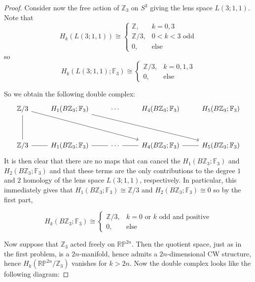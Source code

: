 \documentclass[reqno]{amsart}
\theoremstyle{definition}
\theoremstyle{remark}
\begin{document}
\begin{proof}
Consider now the free action of
$\mathbb{Z}_3$ on $S^3$ giving
 the lens space $L(3;1,1)$.
 Note that
  \[
  H_k(L(3;1,1)) \cong
  \begin{cases}
      \mathbb{Z},& k=0,3\\
      \mathbb{Z} / 3,& 0<k<3 \text{ odd}\\
     0,& \text{else}
  \end{cases}
  \] 
  so
  \[
  H_k\left( L(3;1,1); \mathbb{F}_3 \right) 
  \cong
  \begin{cases}
      \mathbb{Z} /3,& k=0,1,3\\
      0,& \text{else}
  \end{cases}
  \] 

So we obtain the following double complex:
\[
    \begin{tikzcd}
	{\mathbb{Z}/3} & {H_1(B\mathbb{Z}_3;\mathbb{F}_3)}
                   & \cdots & {H_4(B\mathbb{Z}_3;\mathbb{F}_3)}
                   & {H_5(B\mathbb{Z}_3;\mathbb{F}_3)} \\
	\\
	{\mathbb{Z}/3} & {H_1(B\mathbb{Z}_3;\mathbb{F}_3)}
                   & \cdots & {H_4(B\mathbb{Z}_3;\mathbb{F}_3)}
                   & {H_5(B\mathbb{Z}_3;\mathbb{F}_3)}
	\arrow[from=1-1, to=3-4]
	\arrow[from=1-2, to=3-5]
	\arrow[no head, from=3-1, to=1-1]
	\arrow[no head, from=3-1, to=3-2]
	\arrow[no head, from=3-2, to=3-3]
	\arrow[no head, from=3-3, to=3-4]
	\arrow[no head, from=3-4, to=3-5]
\end{tikzcd}
\]
It is then clear that there are no maps that can
cancel the $H_1\left( B\mathbb{Z}_3 ;\mathbb{F}_3\right) $ and
$H_2\left( B\mathbb{Z}_3; \mathbb{F}_3 \right) $ and
that these terms are the only contributions to the
degree $1$ and $2$ homology of the
lens space $L(3;1,1)$, respectively.
In particular, this immediately gives that
$H_1\left( B\mathbb{Z}_3; \mathbb{F}_3 \right)
\cong \mathbb{Z} /3$ and
$H_2 \left( B\mathbb{Z}_3 ; \mathbb{F}_3 \right) \cong
0$
so by the first part,

\[
H_k \left( B\mathbb{Z}_3 ; \mathbb{F}_3 \right) 
\cong
\begin{cases}
    \mathbb{Z}/3,& k=0 \text{ or } k \text{ odd and positive}\\
    0,& \text{else}
\end{cases}
\] 

Now suppose that
$\mathbb{Z}_3$ acted freely on
$\mathbb{R}\mathbb{P}^{2n}$.
Then the quotient space, just as in the first problem,
is a $2n$-manifold, hence admits
a $2n$-dimensional CW structure, hence
$H_k(\mathbb{R}\mathbb{P}^{2n}/ \mathbb{Z}_3)$ vanishes
for $k>2n$.
Now the double complex looks like the following diagram:



\end{proof}
\end{document}
